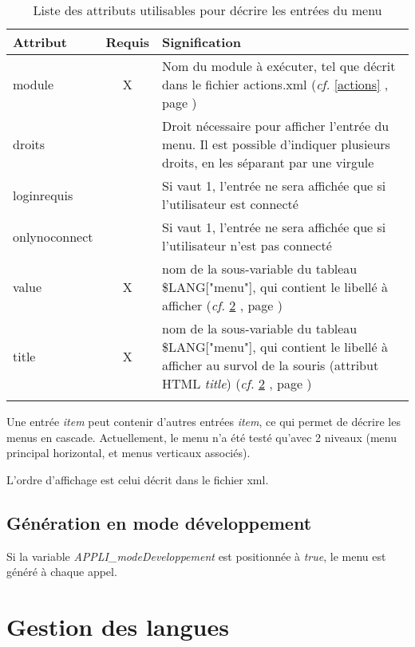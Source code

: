 \begin{longtable}{|p{2.5cm}|c|p{9cm}|}
\hline
\textbf{Attribut} & \textbf{Requis} & \textbf{Signification} \\
\hline
\endhead
module & X & Nom du module à exécuter, tel que décrit dans le fichier actions.xml (\textit{cf.} \ref{actions} \textit{\nameref{actions}}, page \pageref{actions})\\
 \hline
droits & & Droit nécessaire pour afficher l'entrée du menu. Il est possible d'indiquer plusieurs droits, en les séparant par une virgule\\
 \hline
loginrequis & & Si vaut 1, l'entrée ne sera affichée que si l'utilisateur est connecté \\
 \hline
onlynoconnect & & Si vaut 1, l'entrée ne sera affichée que si l'utilisateur n'est pas connecté\\
 \hline
value & X & nom de la sous-variable du tableau \$LANG["menu"], qui contient le libellé à afficher (\textit{cf.} \ref{langue} \textit{\nameref{langue}}, page \pageref{langue})\\
 \hline
title & X & nom de la sous-variable du tableau  \$LANG["menu"], qui contient le libellé à afficher au survol de la souris (attribut HTML \textit{title})  (\textit{cf.} \ref{langue} \textit{\nameref{langue}}, page \pageref{langue})\\
 \hline

\caption{Liste des attributs utilisables pour décrire les entrées du menu}
\end{longtable}

Une entrée \textit{item} peut contenir d'autres entrées \textit{item}, ce qui permet de décrire les menus en cascade. Actuellement, le menu n'a été testé qu'avec 2 niveaux (menu principal horizontal, et menus verticaux associés).

L'ordre d'affichage est celui décrit dans le fichier xml.

\section{Génération en mode développement}

Si la variable \textit{APPLI\_modeDeveloppement} est positionnée à \textit{true}, le menu est généré à chaque appel.

\chapter{Gestion des langues}\label{langue}

